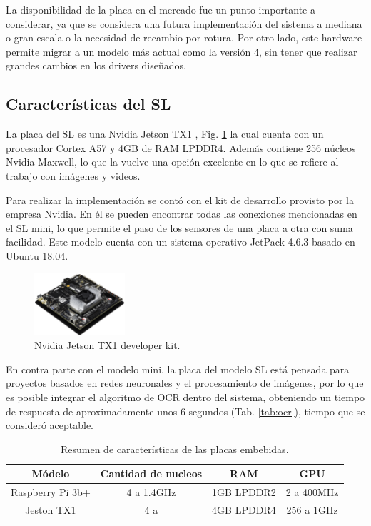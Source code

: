 La disponibilidad de la placa en el mercado fue un punto importante a considerar, ya que se considera una futura implementación del sistema a mediana o gran escala o la necesidad de recambio por rotura. Por otro lado, este hardware permite migrar a un modelo más actual como la versión 4, sin tener que realizar grandes cambios en los drivers diseñados.


\subsection{Características del SL}

La placa del SL es una Nvidia Jetson TX1 \cite{nvidia_manual_nodate}, Fig. \ref{fig:JTX1} la cual cuenta con un procesador Cortex A57 y 4GB de RAM LPDDR4. Además contiene  256 núcleos Nvidia Maxwell, lo que la vuelve una opción excelente en lo que se refiere al trabajo con imágenes y videos.

Para realizar la implementación se contó con el kit de desarrollo provisto por la empresa Nvidia. En él se pueden encontrar todas las conexiones mencionadas en el SL mini, lo que permite el paso de los sensores de una placa a otra con suma facilidad.
Este modelo cuenta con un sistema operativo JetPack 4.6.3 basado en Ubuntu 18.04.

\begin{figure}[bth]
    \centering
    \includegraphics[width=0.3\textwidth]{imgs/JTX1-developerkit.png}
    \caption{Nvidia Jetson TX1 developer kit.}
    \label{fig:JTX1}
\end{figure}


En contra parte con el modelo mini, la placa del modelo SL está pensada para proyectos basados en redes neuronales y el procesamiento de imágenes, por lo que es posible integrar el algoritmo de OCR dentro del sistema, obteniendo un tiempo de respuesta de aproximadamente unos 6 segundos (Tab. \ref{tab:ocr}), tiempo que se consideró aceptable.


\begin{table}[bth]
    \centering
    \begin{tabular}{cccc}
        \toprule
        Módelo           & Cantidad de nucleos & RAM        & GPU        \\
        \midrule
        Raspberry Pi 3b+ & 4 a 1.4GHz          & 1GB LPDDR2 & 2 a 400MHz \\
        Jeston TX1       & 4 a                 & 4GB LPDDR4 & 256 a 1GHz \\
        \bottomrule
    \end{tabular}
    \caption{Resumen de características de las placas embebidas.}
\end{table}

